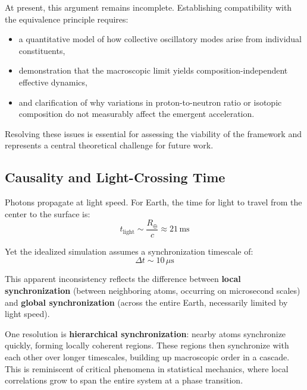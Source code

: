 \documentclass[12pt,letterpaper]{article}
\begin{document}
At present, this argument remains incomplete. Establishing compatibility with the equivalence principle requires:
\begin{itemize}
\item a quantitative model of how collective oscillatory modes arise from individual constituents,
\item demonstration that the macroscopic limit yields composition-independent effective dynamics,
\item and clarification of why variations in proton-to-neutron ratio or isotopic composition do not measurably affect the emergent acceleration.
\end{itemize}

Resolving these issues is essential for assessing the viability of the framework and represents a central theoretical challenge for future work.


\subsection{Causality and Light-Crossing Time}
\label{subsec:causality}

Photons propagate at light speed. For Earth, the time for light to travel from the center to the surface is:
\begin{equation}
t_\text{light} \sim \frac{R_\oplus}{c} \approx 21 \, \text{ms}
\end{equation}

Yet the idealized simulation assumes a synchronization timescale of:
\begin{equation}
\Delta t \sim 10 \, \mu\text{s}
\end{equation}

This apparent inconsistency reflects the difference between \textbf{local synchronization} (between neighboring atoms, occurring on microsecond scales) and \textbf{global synchronization} (across the entire Earth, necessarily limited by light speed).

One resolution is \textbf{hierarchical synchronization}: nearby atoms synchronize quickly, forming locally coherent regions. These regions then synchronize with each other over longer timescales, building up macroscopic order in a cascade. This is reminiscent of critical phenomena in statistical mechanics, where local correlations grow to span the entire system at a phase transition.
\end{document}
